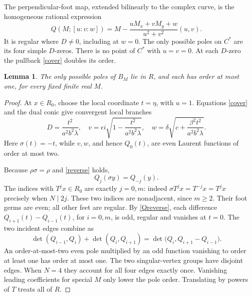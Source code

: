 \documentclass[11pt]{article}
\newtheorem{lemma}{Lemma}
\begin{document}
The perpendicular-foot map, extended bilinearly to the complex curve,
is the homogeneous rational expression
\begin{equation}\label{foot}
 Q(M;[u:v:w])
 =M-\frac{uM_x+vM_y+w}{u^2+v^2}(u,v).
\end{equation}
It is regular where \(D\ne0\), including at \(w=0\).
The only possible poles on \(C^*\) are its four simple \(D\)-zeros.
There is no point of \(C^*\) with \(u=v=0\).
At each \(D\)-zero the pullback \eqref{cover} doubles its order.

\begin{lemma}\label{polesB}
The only possible poles of \(B_M\) lie in \(R\), and each has order
at most one, for every fixed finite real \(M\).
\end{lemma}
\begin{proof}
At \(x\in R_0\), choose the local coordinate \(t=\eta\), with \(u=1\).
Equations \eqref{cover} and the dual conic give convergent local branches
\[
 D=\frac{t^2}{a^2b^2\lambda},\quad
 v=\epsilon i\sqrt{1-\frac{t^2}{a^2b^2\lambda}},\quad
 w=\delta\sqrt{c+\frac{\beta^2t^2}{a^2b^2\lambda}}.
\]
Here \(\sigma(t)=-t\), while \(v,w\), and hence \(Q_0(t)\),
are even Laurent functions of order at most two.

Because \(\rho\sigma=\rho\) and \eqref{reverse} holds,
\begin{equation}\label{Qreverse}
 Q_j(\sigma y)=Q_{-j}(y).
\end{equation}
The indices with \(T^jx\in R_0\) are exactly \(j=0,m\):
indeed \(\sigma T^jx=T^{-j}x=T^jx\) precisely when \(N\mid2j\).
These two indices are nonadjacent, since \(m\ge2\).
Their foot germs are even; all other feet are regular.
By \eqref{Qreverse}, each difference
\(Q_{i+1}(t)-Q_{i-1}(t)\), for \(i=0,m\), is odd, regular
and vanishes at \(t=0\). The two incident edges combine as
\[
 \det(Q_{i-1},Q_i)+\det(Q_i,Q_{i+1})
 =\det\bigl(Q_i,Q_{i+1}-Q_{i-1}\bigr).
\]
An order-at-most-two even pole multiplied by an odd function vanishing
to order at least one has order at most one.
The two singular-vertex groups have disjoint edges.
When \(N=4\) they account for all four edges exactly once.
Vanishing leading coefficients for special \(M\) only lower the
pole order. Translating by powers of \(T\) treats all of \(R\).
\end{proof}
\end{document}
